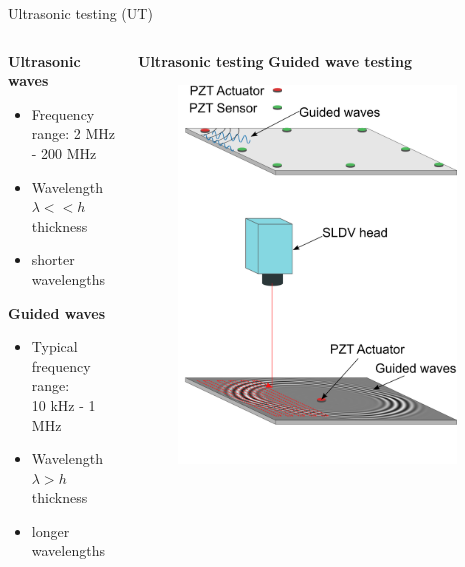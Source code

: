 \documentclass[10pt,aspectratio=169,dvipsnames]{beamer} %
\begin{document}
	\begin{frame}{Ultrasonic testing (UT)} 
		\begin{columns}[T]
			\begin{column}[c]{0.38\textwidth}
				\textbf{Ultrasonic waves}	
				\begin{itemize}
					\item Frequency range: 2 MHz - 200 MHz
					\item Wavelength \(\lambda << h\) thickness 
					\item shorter wavelengths
				\end{itemize}
				\textbf{Guided waves}	
				\begin{itemize}
					\item Typical frequency range: \\ 10 kHz - 1 MHz
					\item Wavelength \(\lambda > h\) thickness 
					\item longer wavelengths
				\end{itemize}
			\end{column}
			\begin{column}[c]{0.6\textwidth}				
				\textbf{Ultrasonic testing} \hspace{50pt} \textbf{Guided wave testing}
				\begin{figure}
					\includegraphics[width=0.95\textwidth]{local_ultrasonic.png}
				\end{figure}
			\end{column}		
		\end{columns}	
	\end{frame}
\end{document}
